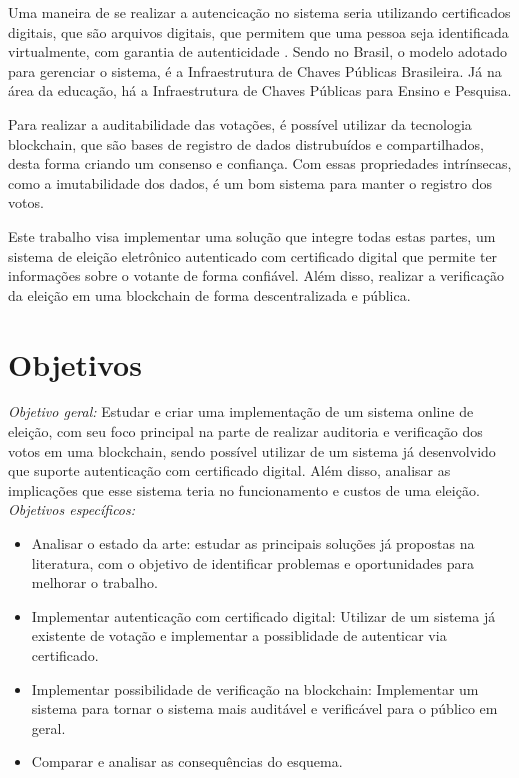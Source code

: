 \documentclass{ufsctex/ufsctex}
\begin{document}
Uma maneira de se realizar a autencicação no sistema seria utilizando certificados
digitais, que são arquivos digitais, que permitem que uma pessoa seja identificada
virtualmente, com garantia de autenticidade \cite{pki}. Sendo no Brasil, o modelo adotado para
gerenciar o sistema, é a Infraestrutura de Chaves Públicas Brasileira. Já na área
da educação, há a Infraestrutura de Chaves Públicas para Ensino e Pesquisa.

Para realizar a auditabilidade das votações, é possível utilizar da tecnologia
blockchain, que são bases de registro de dados distrubuídos e compartilhados,
desta forma criando um consenso e confiança. \cite{nakamoto2012bitcoin} Com essas
propriedades intrínsecas, como a imutabilidade dos dados, é um bom sistema para 
manter o registro dos votos.

Este trabalho visa implementar uma solução que integre todas estas partes, um sistema
de eleição eletrônico autenticado com certificado digital que permite ter informações
sobre o votante de forma confiável. Além disso, realizar a verificação da eleição em 
uma blockchain de forma descentralizada e pública.

\section{Objetivos}

\noindent \emph{Objetivo geral:} Estudar e criar uma implementação de um sistema
online de eleição, com seu foco principal na parte de realizar auditoria e
verificação dos votos em uma blockchain, sendo possível utilizar de um sistema
já desenvolvido que suporte autenticação com certificado digital. Além disso,
analisar as implicações que esse sistema teria no funcionamento e custos de
uma eleição. \\

\noindent \emph{Objetivos específicos: }
	\begin{itemize}
		\item Analisar o estado da arte: estudar as principais soluções
		já propostas na literatura, com o objetivo de identificar problemas
		e oportunidades para melhorar o trabalho.
		\item Implementar autenticação com certificado digital: Utilizar
		de um sistema já existente de votação e implementar a possiblidade
		de autenticar via certificado.
		\item Implementar possibilidade de verificação na blockchain:
		Implementar um sistema para tornar o sistema mais auditável e 
		verificável para o público em geral.
		\item Comparar e analisar as consequências do esquema.
	\end{itemize}
\end{document}
